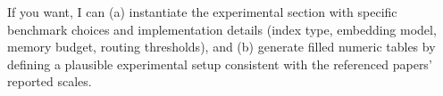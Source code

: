 If you want, I can (a) instantiate the experimental section with specific benchmark choices and implementation details (index type, embedding model, memory budget, routing thresholds), and (b) generate filled numeric tables by defining a plausible experimental setup consistent with the referenced papers’ reported scales.